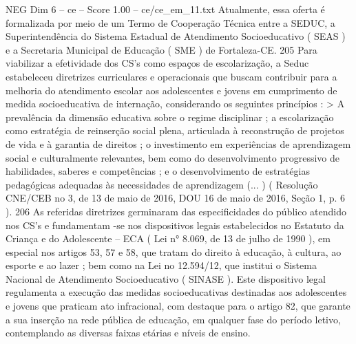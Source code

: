 \begin{textsample}{NEG Dim 6 – ce – Score 1.00 – ce/ce\_em\_11.txt}
Atualmente, essa oferta é formalizada por meio de um Termo de Cooperação Técnica entre a SEDUC, a Superintendência do Sistema Estadual de Atendimento Socioeducativo ( SEAS ) e a Secretaria Municipal de Educação ( SME ) de Fortaleza-CE. 205 Para viabilizar a efetividade dos CS’s como espaços de escolarização, a Seduc estabeleceu diretrizes curriculares e operacionais que buscam contribuir para a melhoria do atendimento escolar aos adolescentes e jovens em cumprimento de medida socioeducativa de internação, considerando os seguintes princípios : > A prevalência da dimensão educativa sobre o regime disciplinar ; a escolarização como estratégia de reinserção social plena, articulada à reconstrução de projetos de vida e à garantia de direitos ; o investimento em experiências de aprendizagem social e culturalmente relevantes, bem como do desenvolvimento progressivo de habilidades, saberes e competências ; e o desenvolvimento de estratégias pedagógicas adequadas às necessidades de aprendizagem (... ) ( Resolução CNE/CEB no 3, de 13 de maio de 2016, DOU 16 de maio de 2016, Seção 1, p. 6 ). 206 As referidas diretrizes germinaram das especificidades do público atendido nos CS’s e fundamentam -se nos dispositivos legais estabelecidos no Estatuto da Criança e do Adolescente – ECA ( Lei n{\EmojiFont °} 8.069, de 13 de julho de 1990 ), em especial nos artigos 53, 57 e 58, que tratam do direito à educação, à cultura, ao esporte e ao lazer ; bem como na Lei no 12.594/12, que institui o Sistema Nacional de Atendimento Socioeducativo ( SINASE ).
Este dispositivo legal regulamenta a execução das medidas socioeducativas destinadas aos adolescentes e jovens que praticam ato infracional, com destaque para o artigo 82, que garante a sua inserção na rede pública de educação, em qualquer fase do período letivo, contemplando as diversas faixas etárias e níveis de ensino.

\end{textsample}
